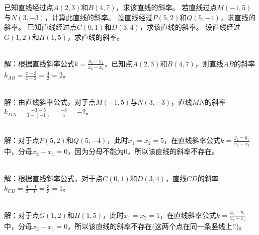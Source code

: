 \begin{Exercise}[title={直线斜率计算小练习}, label={ex:line_slope}]
    \Question 已知直线经过点\(A(2, 3)\)和\(B(4, 7)\)，求该直线的斜率。
    \Question 若直线过点\(M(-1, 5)\)与\(N(3, -3)\)，计算此直线的斜率。
    \Question 设直线经过\(P(5, 2)\)和\(Q(5, -4)\)，求直线的斜率。
    \Question 已知直线经过点\(C(0, 1)\)和\(D(3, 4)\)，求该直线的斜率。
    \Question 设直线经过\(G(1, 2)\)和\(H(1, 5)\)，求直线的斜率。
\end{Exercise}
\begin{MyAnswer}[ref={ex:line_slope}]
    \Question {}\\ 解：根据直线斜率公式\(k = \frac{y_2 - y_1}{x_2 - x_1}\)，已知点\(A(2, 3)\)和\(B(4, 7)\)，则直线\(AB\)的斜率\(k_{AB}=\frac{7 - 3}{4 - 2}=\frac{4}{2}=2\)。

    \Question {}\\ 解：由直线斜率公式，对于点\(M(-1, 5)\)与\(N(3, -3)\)，直线\(MN\)的斜率\(k_{MN}=\frac{-3 - 5}{3 - (-1)}=\frac{-8}{4}=-2\)。

    \Question  {}\\  解：对于点\(P(5, 2)\)和\(Q(5, -4)\)，此时\(x_1 = x_2 = 5\)，在直线斜率公式\(k = \frac{y_2 - y_1}{x_2 - x_1}\)中，分母\(x_2 - x_1 = 0\)，因为分母不能为\(0\)，所以该直线的斜率不存在。

    \Question {}\\ 解：根据直线斜率公式，对于点\(C(0, 1)\)和\(D(3, 4)\)，直线\(CD\)的斜率\(k_{CD}=\frac{4 - 1}{3 - 0}=\frac{3}{3}=1\)。


    \Question {}\\ 解：对于点\(G(1, 2)\)和\(H(1, 5)\)，此时\(x_1 = x_2 = 1\)，在直线斜率公式\(k = \frac{y_2 - y_1}{x_2 - x_1}\)中，分母\(x_2 - x_1 = 0\)，所以该直线的斜率不存在(这两个点在同一条竖线上!!)。

\end{MyAnswer}






